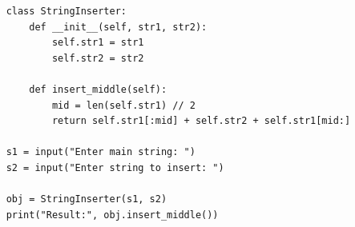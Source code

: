 \begin{verbatim}
    class StringInserter:
        def __init__(self, str1, str2):
            self.str1 = str1
            self.str2 = str2
    
        def insert_middle(self):
            mid = len(self.str1) // 2
            return self.str1[:mid] + self.str2 + self.str1[mid:]
    
    s1 = input("Enter main string: ")
    s2 = input("Enter string to insert: ")
    
    obj = StringInserter(s1, s2)
    print("Result:", obj.insert_middle())
\end{verbatim}